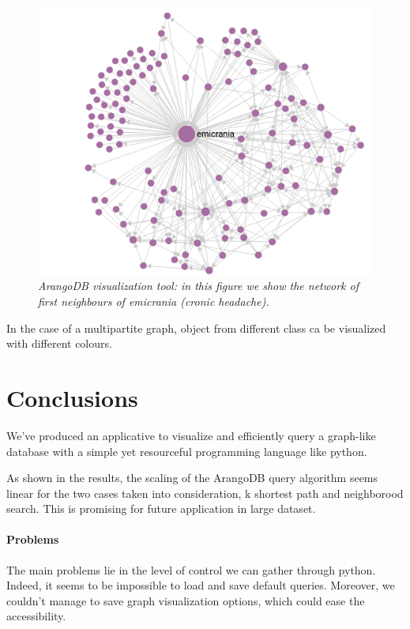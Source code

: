 \documentclass[11pt,twocolumn]{article}
\begin{document}
\begin{figure}[ht!]
   \includegraphics[width=\linewidth]{images/neigh_emicrania.png}
   \caption{\small{\textit{ArangoDB visualization tool: in this figure we show the network of first neighbours of \textit{emicrania} (cronic headache).}}}
   \label{fig:4}
\end{figure}

In the case of a multipartite graph, object from different class ca be visualized with different colours.

\section{Conclusions}

We've produced an applicative to visualize and efficiently query a graph-like database with a simple yet resourceful programming language like python.

As shown in the results, the scaling of the ArangoDB query algorithm seems linear for the two cases taken into consideration, k shortest path and neighborood search. This is promising for future application in large dataset.

\paragraph{Problems}

The main problems lie in the level of control we can gather through python. Indeed, it seems to be impossible to load and save default queries.
Moreover, we couldn't manage to save graph visualization options, which could ease the accessibility.
\end{document}
